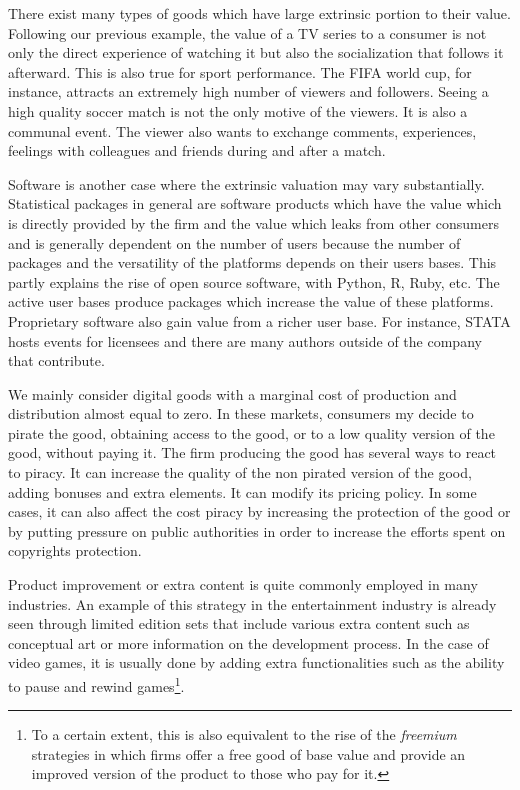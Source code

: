 \documentclass[12pt]{article}
\numberwithin{equation}{section}
\begin{document}
There exist many types of goods which have large extrinsic portion to their value. Following our previous example, the value of a TV series to a consumer is not only the direct experience of watching it but also the socialization that follows it afterward. This is also true for sport performance. The FIFA world cup, for instance, attracts an extremely high number of viewers and followers. Seeing a high quality soccer match is not the only motive of the viewers. It is also a communal event. The viewer also wants to exchange comments, experiences, feelings with colleagues and friends during and after a match. 

Software is another case where the extrinsic valuation may vary substantially. Statistical packages in general are software products which have the value which is directly provided by the firm and the value which leaks from other consumers and is generally dependent on the number of users because the number of packages and the versatility of the platforms depends on their users bases. This partly explains the rise of open source software, with Python, R, Ruby, etc.  The active user bases produce packages which increase the value of these platforms. Proprietary software also gain value from a richer user base. For instance, STATA hosts events for licensees and there are many authors outside of the company that contribute.

We mainly consider digital goods with a marginal cost of production and distribution almost equal to zero. In these markets, consumers my decide to pirate the good, obtaining access to the good, or to a low quality version of the good, without paying it. The firm producing the good has several ways to react to piracy. It can increase the quality of the non pirated version of the good, adding bonuses and extra elements. It can modify its pricing policy. In some cases, it can also affect the cost piracy by increasing the protection of the good or by putting pressure on public authorities in order to increase the efforts spent on copyrights protection. 

Product improvement or extra content is quite commonly employed in many industries. An example of this strategy in the entertainment industry is already seen through limited edition sets that include various extra content such as conceptual art or more information on the development process. In the case of video games, it is usually done by adding extra functionalities such as the ability to pause and rewind games\footnote{To a certain extent, this is also equivalent to the rise of the \textit{freemium} strategies in which firms offer a free good of base value and provide an improved version of the product to those who pay for it.}.
\end{document}
